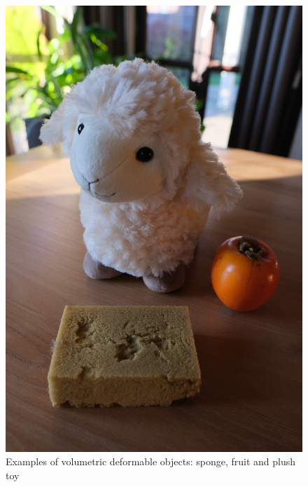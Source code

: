 \begin{figure}[htbp!]
    \centering
    \includegraphics[keepaspectratio,width=\textwidth]{figures/fig_3d_deformables_ex.JPG}
    \caption[Solid deformable objects]{Examples of volumetric deformable objects: sponge, fruit and plush toy}
    \label{fig:volumetric_deform_objects_examples}
\end{figure}